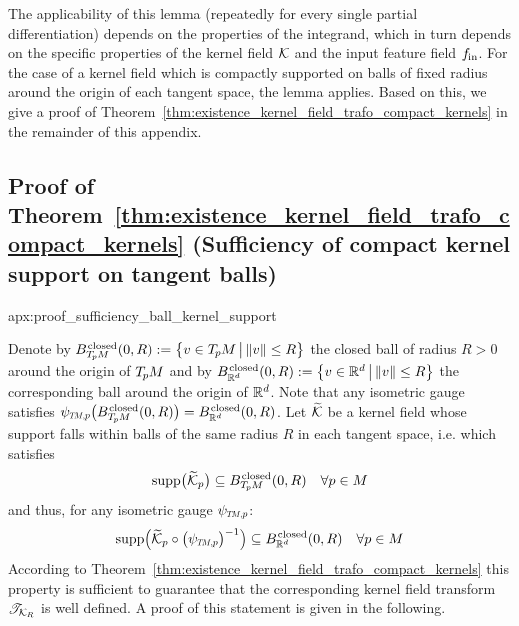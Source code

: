 The applicability of this lemma (repeatedly for every single partial differentiation) depends on the properties of the integrand, which in turn depends on the specific properties of the kernel field $\mathcal{K}$ and the input feature field $f_\textup{\;\!\!in}$.
For the case of a kernel field which is compactly supported on balls of fixed radius around the origin of each tangent space, the lemma applies.
Based on this, we give a proof of Theorem~\ref{thm:existence_kernel_field_trafo_compact_kernels} in the remainder of this appendix.










\toclesslab\subsection{Proof of Theorem~\ref{thm:existence_kernel_field_trafo_compact_kernels} (Sufficiency of compact kernel support on tangent balls)}{apx:proof_sufficiency_ball_kernel_support}

Denote by
$B_{T_{\mkern-1.5mu p}\mkern-.5muM}^{\mkern1.5mu\textup{closed}}(0,R) := \big\{ v\in T_{\mkern-1.5mu p}\mkern-.5muM \,\big|\, \lVert v\rVert \leq R \big\}$
the closed ball of radius $R>0$ around the origin of $T_{\mkern-1.5mu p}\mkern-.5muM$ and by
$B_{\mathbb{R}^d}^{\mkern1.5mu\textup{closed}}(0,R) := \big\{ v\in\mathbb{R}^d \,\big|\, \lVert v\rVert \leq R \big\}$
the corresponding ball around the origin of $\mathbb{R}^d$.
Note that any isometric gauge satisfies $\psiTMp\big(B_{\TpM}^{\mkern1.5mu\textup{closed}}(0,R)\big) = B_{\R^d}^{\mkern1.5mu\textup{closed}}(0,R)$.
Let $\widetilde{\mathcal{K}}$ be a kernel field whose support falls within balls of the same radius $R$ in each tangent space, i.e. which satisfies
\begin{align}
    \operatorname{supp}\!\big(\widetilde{\mathcal{K}}_p\big) \subseteq B_{T_{\mkern-1.5mu p}\mkern-.5muM}^{\mkern1.5mu\textup{closed}}(0,R) \quad \forall p\in M
\end{align}
and thus, for any isometric gauge $\psiTMp$:
\begin{align}
    \supp\! \pig(\widetilde{\K}_p \circ \big(\psiTMp\big)^{-1} \pig) \subseteq B_{\R^d}^{\mkern1.5mu\textup{closed}}(0,R) \quad \forall p\in M
\end{align}
According to Theorem~\ref{thm:existence_kernel_field_trafo_compact_kernels} this property is sufficient to guarantee that the corresponding kernel field transform $\mathscr{T}_{\mathcal{K}_{\mkern-1muR}}$ is well defined.
A proof of this statement is given in the following.

